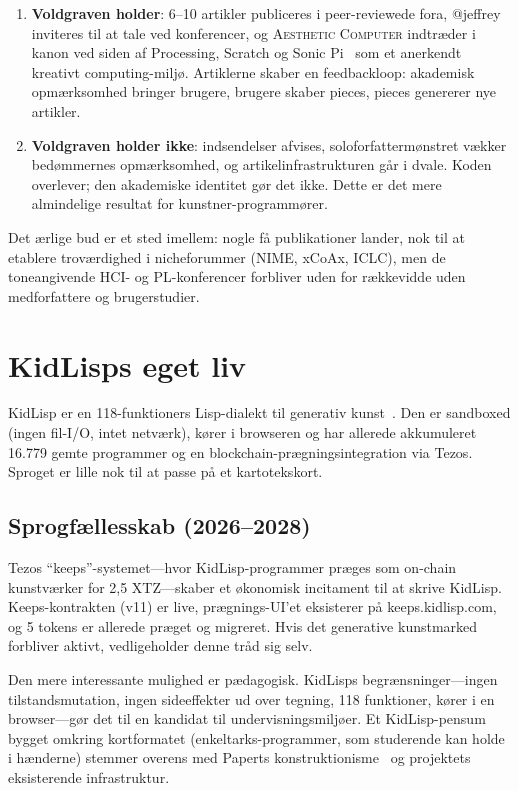 \documentclass[10pt,letterpaper,twocolumn]{article}
\newcommand{\ac}{\textsc{Aesthetic Computer}}
\begin{document}
\begin{enumerate}
  \item \textbf{Voldgraven holder}: 6--10 artikler publiceres i peer-reviewede fora, @jeffrey inviteres til at tale ved konferencer, og \ac{} indtræder i kanon ved siden af Processing, Scratch og Sonic Pi~\citep{aaron2016sonic} som et anerkendt kreativt computing-miljø. Artiklerne skaber en feedbackloop: akademisk opmærksomhed bringer brugere, brugere skaber pieces, pieces genererer nye artikler.
  \item \textbf{Voldgraven holder ikke}: indsendelser afvises, soloforfattermønstret vækker bedømmernes opmærksomhed, og artikelinfrastrukturen går i dvale. Koden overlever; den akademiske identitet gør det ikke. Dette er det mere almindelige resultat for kunstner-programmører.
\end{enumerate}

Det ærlige bud er et sted imellem: nogle få publikationer lander, nok til at etablere troværdighed i nicheforummer (NIME, xCoAx, ICLC), men de toneangivende HCI- og PL-konferencer forbliver uden for rækkevidde uden medforfattere og brugerstudier.


\section{KidLisps eget liv}
\label{sec:kidlisp}

KidLisp er en 118-funktioners Lisp-dialekt til generativ kunst~\citep{scudder2026kidlisp}. Den er sandboxed (ingen fil-I/O, intet netværk), kører i browseren og har allerede akkumuleret 16.779 gemte programmer og en blockchain-prægningsintegration via Tezos. Sproget er lille nok til at passe på et kartotekskort.

\subsection{Sprogfællesskab (2026--2028)}

Tezos ``keeps''-systemet---hvor KidLisp-programmer præges som on-chain kunstværker for 2,5 XTZ---skaber et økonomisk incitament til at skrive KidLisp. Keeps-kontrakten (v11) er live, prægnings-UI'et eksisterer på keeps.kidlisp.com, og 5 tokens er allerede præget og migreret. Hvis det generative kunstmarked forbliver aktivt, vedligeholder denne tråd sig selv.

Den mere interessante mulighed er pædagogisk. KidLisps begrænsninger---ingen tilstandsmutation, ingen sideeffekter ud over tegning, 118 funktioner, kører i en browser---gør det til en kandidat til undervisningsmiljøer. Et KidLisp-pensum bygget omkring kortformatet (enkeltarks-programmer, som studerende kan holde i hænderne) stemmer overens med Paperts konstruktionisme~\citep{papert1980mindstorms} og projektets eksisterende infrastruktur.
\end{document}
